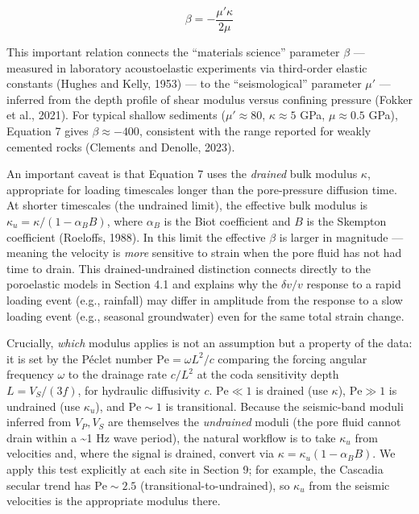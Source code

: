 \documentclass[draft]{agujournal2019}
\begin{document}
\[\beta = -\frac{\mu' \kappa}{2\mu} \tag{7}\]

This important relation connects the ``materials science'' parameter
\(\beta\) --- measured in laboratory acoustoelastic experiments via
third-order elastic constants (Hughes and Kelly, 1953) --- to the
``seismological'' parameter \(\mu'\) --- inferred from the depth profile
of shear modulus versus confining pressure (Fokker et al., 2021). For
typical shallow sediments (\(\mu' \approx 80\), \(\kappa \approx 5\)
GPa, \(\mu \approx 0.5\) GPa), Equation 7 gives \(\beta \approx -400\),
consistent with the range reported for weakly cemented rocks (Clements
and Denolle, 2023).

An important caveat is that Equation 7 uses the \emph{drained} bulk
modulus \(\kappa\), appropriate for loading timescales longer than the
pore-pressure diffusion time. At shorter timescales (the undrained
limit), the effective bulk modulus is
\(\kappa_u = \kappa / (1 - \alpha_B B)\), where \(\alpha_B\) is the Biot
coefficient and \(B\) is the Skempton coefficient (Roeloffs, 1988). In
this limit the effective \(\beta\) is larger in magnitude --- meaning
the velocity is \emph{more} sensitive to strain when the pore fluid has
not had time to drain. This drained-undrained distinction connects
directly to the poroelastic models in Section 4.1 and explains why the
\(\delta v/v\) response to a rapid loading event (e.g., rainfall) may
differ in amplitude from the response to a slow loading event (e.g.,
seasonal groundwater) even for the same total strain change.

Crucially, \emph{which} modulus applies is not an assumption but a
property of the data: it is set by the Péclet number
\(\mathrm{Pe} = \omega L^2/c\) comparing the forcing angular frequency
\(\omega\) to the drainage rate \(c/L^2\) at the coda sensitivity depth
\(L = V_S/(3f)\), for hydraulic diffusivity \(c\). \(\mathrm{Pe} \ll 1\)
is drained (use \(\kappa\)), \(\mathrm{Pe} \gg 1\) is undrained (use
\(\kappa_u\)), and \(\mathrm{Pe}\sim 1\) is transitional. Because the
seismic-band moduli inferred from \(V_P, V_S\) are themselves the
\emph{undrained} moduli (the pore fluid cannot drain within a
\textasciitilde{}1 Hz wave period), the natural workflow is to take
\(\kappa_u\) from velocities and, where the signal is drained, convert
via \(\kappa = \kappa_u(1-\alpha_B B)\). We apply this test explicitly
at each site in Section 9; for example, the Cascadia secular trend has
\(\mathrm{Pe}\sim 2.5\) (transitional-to-undrained), so \(\kappa_u\)
from the seismic velocities is the appropriate modulus there.
\end{document}
